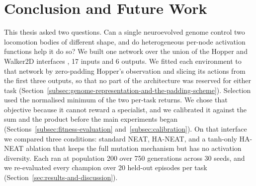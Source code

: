\documentclass[12pt]{article}
\begin{document}



\section{Conclusion and Future Work}
\label{sec:conclusion-and-future-work}

This thesis asked two questions. Can a single neuroevolved genome control two locomotion bodies of different shape, and do heterogeneous per-node activation functions help it do so?
We built one network over the union of the Hopper and Walker2D interfaces \parencite{freeman_brax_2021}, 17 inputs and 6 outputs. We fitted each environment to that network by zero-padding Hopper's observation and slicing its actions from the first three outputs, so that no part of the architecture was reserved for either task (Section~\ref{subsec:genome-representation-and-the-padding-scheme}).
Selection used the normalised minimum of the two per-task returns. We chose that objective because it cannot reward a specialist, and we calibrated it against the sum and the product before the main experiments began (Sections~\ref{subsec:fitness-evaluation} and~\ref{subsec:calibration}).
On that interface we compared three conditions: standard NEAT, HA-NEAT, and a tanh-only HA-NEAT ablation that keeps the full mutation mechanism but has no activation diversity. Each ran at population 200 over 750 generations across 30 seeds, and we re-evaluated every champion over 20 held-out episodes per task (Section~\ref{sec:results-and-discussion}).

\end{document}
